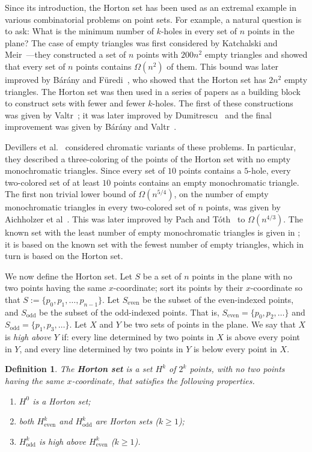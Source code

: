 \documentclass{article}
\newtheorem{defn}{Definition}
\begin{document}
Since its introduction, the Horton set has been used as an extremal
example in various combinatorial problems on point sets. 
For example, a natural question is to ask: What is the minimum number
of $k$-holes in every set of $n$ points in the plane? The case
of empty triangles was first considered by Katchalski and Meir~\cite{katmeir}---they constructed 
a set of $n$ points with $200n^2$ empty triangles
and showed that every set of $n$ points contains $\Omega(n^2)$ of them. 
This bound  was later improved by B\'ar\'any and F\"uredi~\cite{emptysimplices}, who
 showed that the Horton set has $2n^2$
empty triangles. The Horton set was then used in a series of papers as a building block
to construct sets with fewer and fewer $k$-holes. The first of these constructions was given by Valtr~\cite{valtr95};
it was later improved by Dumitrescu~\cite{dumi00} and the final improvement was given by B\'ar\'any and Valtr~\cite{valtr04}.

Devillers et al.~\cite{chromaticvariants} considered chromatic variants of these problems. In particular,
they described a three-coloring of the points of the Horton set with no empty monochromatic triangles. Since every set
of $10$ points contains a $5$-hole, every two-colored set of at least $10$ points contains
 an empty monochromatic triangle. The first non trivial lower bound of $\Omega(n^{5/4})$, on 
the number of empty monochromatic triangles
in every two-colored set of $n$ points, was given by Aichholzer et al~\cite{trimono}. 
This was later improved by Pach and T\'oth~\cite{tripach} to $\Omega(n^{4/3})$. 
The known set with the least number of empty monochromatic triangles is 
given in \cite{trimono}; it is based on the known set with the fewest
number of empty triangles, which in turn is based on the Horton set.

We now define the Horton set.
Let $S$ be a set of $n$ points in the plane with no two points
having the same $x$-coordinate; sort
its points by their $x$-coordinate so that 
$S:=\{p_0, p_1,\dots, p_{n-1}\}$. Let $S_{\textrm{even}}$ be the subset of the
even-indexed points, and  $S_{\textrm{odd}}$ be the subset of the 
odd-indexed points. That is, $S_{\textrm{even}}=\{p_0, p_2,\dots\}$
and $S_{\textrm{odd}}=\{p_1, p_3,\dots\}$. Let $X$ and $Y$ be two sets of points in the plane.
We say that $X$ is \emph{high above} $Y$ if: every line determined by two points in $X$ is above every point in $Y$, and
every line determined by two points in $Y$ is below every point in $X$.


\begin{defn} \label{def:mat} 
The \textbf{Horton set} is a set $H^k$ of $2^k$ points, with no two points having
the same $x$-coordinate, that satisfies the following properties.
\begin{enumerate}
  \item $H^0$ is a Horton set;

  \item both $H_{\textrm{even}}^k$ and $H_{\textrm{odd}}^k$ are Horton sets ($k \ge 1$);
  
  \item $H_{\textrm{odd}}^k$ is high above $H_{\textrm{even}}^k$ ($k \ge 1$).
\end{enumerate}
\end{defn}
\end{document}
